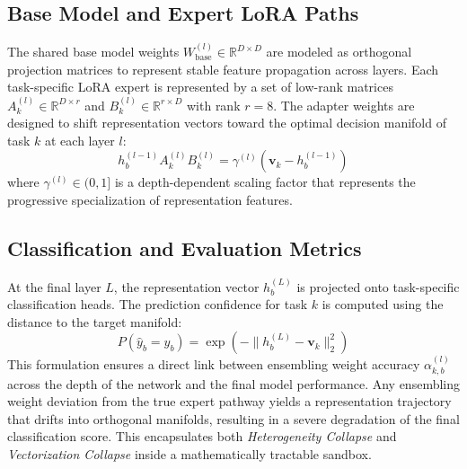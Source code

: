 \documentclass{article}
\theoremstyle{plain}
\theoremstyle{definition}
\theoremstyle{remark}
\begin{document}
\subsection{Base Model and Expert LoRA Paths}
The shared base model weights $W_{\text{base}}^{(l)} \in \mathbb{R}^{D \times D}$ are modeled as orthogonal projection matrices to represent stable feature propagation across layers. Each task-specific LoRA expert is represented by a set of low-rank matrices $A_k^{(l)} \in \mathbb{R}^{D \times r}$ and $B_k^{(l)} \in \mathbb{R}^{r \times D}$ with rank $r = 8$. The adapter weights are designed to shift representation vectors toward the optimal decision manifold of task $k$ at each layer $l$:
\begin{equation}
h_{b}^{(l-1)} A_k^{(l)} B_k^{(l)} = \gamma^{(l)} \left( \mathbf{v}_k - h_{b}^{(l-1)} \right)
\end{equation}
where $\gamma^{(l)} \in (0, 1]$ is a depth-dependent scaling factor that represents the progressive specialization of representation features.

\subsection{Classification and Evaluation Metrics}
At the final layer $L$, the representation vector $h_{b}^{(L)}$ is projected onto task-specific classification heads. The prediction confidence for task $k$ is computed using the distance to the target manifold:
\begin{equation}
P(\hat{y}_b = y_b) = \exp\left( -\|h_{b}^{(L)} - \mathbf{v}_k\|_2^2 \right)
\end{equation}
This formulation ensures a direct link between ensembling weight accuracy $\alpha_{k, b}^{(l)}$ across the depth of the network and the final model performance. Any ensembling weight deviation from the true expert pathway yields a representation trajectory that drifts into orthogonal manifolds, resulting in a severe degradation of the final classification score. This encapsulates both \emph{Heterogeneity Collapse} and \emph{Vectorization Collapse} inside a mathematically tractable sandbox.
\end{document}
